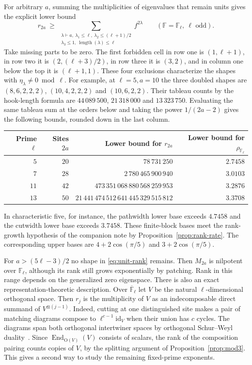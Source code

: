 \documentclass[11pt]{article}
\theoremstyle{definition}
\newcommand{\F}{\mathbb F}
\newcommand{\id}{\mathrm{id}}
\DeclareMathOperator{\End}{End}
\begin{document}
For arbitrary \(a\), summing the multiplicities of eigenvalues that remain units gives the explicit lower bound
\begin{equation}\label{eq:unit-rank}
 r_{2a}\ \ge\
 \sum_{\substack{\lambda\vdash a,\ \lambda_1\le\ell,\ \lambda_2\le(\ell+1)/2\\
                  \lambda_3\le1,\ \operatorname{length}(\lambda)\le\ell}} f^{2\lambda}
 \qquad(\F=\mathbb F_\ell,\ \ell\text{ odd}).
\end{equation}
Take missing parts to be zero. The first forbidden cell in row one is \((1,\ell+1)\), in row two it is \((2,(\ell+3)/2)\), in row three it is \((3,2)\), and in column one below the top it is \((\ell+1,1)\). These four exclusions characterize the shapes with \(\eta_\lambda\ne0\bmod\ell\). For example, at \(\ell=5,a=10\) the three doubled shapes are \((8,6,2,2,2)\), \((10,4,2,2,2)\) and \((10,6,2,2)\). Their tableau counts by the hook-length formula are \(44\,089\,500\), \(21\,318\,000\) and \(13\,323\,750\). Evaluating the same tableau sum at the orders below and taking the power \(1/(2a-2)\) gives the following bounds, rounded down in the last column.
\begin{center}
\begin{tabular}{@{}rrrr@{}}
\hline
Prime \(\ell\) & Sites \(2a\) & Lower bound for \(r_{2a}\) & Lower bound for \(\rho_{\mathbb F_\ell}\)\\
\hline
\(5\) & \(20\) & \(78\,731\,250\) & \(2.7458\)\\
\(7\) & \(28\) & \(2\,780\,465\,900\,940\) & \(3.0103\)\\
\(11\) & \(42\) & \(473\,351\,068\,880\,568\,259\,953\) & \(3.2876\)\\
\(13\) & \(50\) & \(21\,441\,474\,512\,641\,445\,329\,515\,812\) & \(3.3708\)\\
\hline
\end{tabular}
\end{center}
In characteristic five, for instance, the pathwidth lower base exceeds \(4.7458\) and the cutwidth lower base exceeds \(3.7458\). These finite-block bases meet the rank-growth hypothesis of the companion note by Proposition~\ref{prop:rank-rate}. The corresponding upper bases are \(4+2\cos(\pi/5)\) and \(3+2\cos(\pi/5)\).

For \(a>(5\ell-3)/2\) no shape in \eqref{eq:unit-rank} remains. Then \(M_{2a}\) is nilpotent over \(\mathbb F_\ell\), although its rank still grows exponentially by patching. Rank in this range depends on the generalized zero eigenspace. There is also an exact representation-theoretic description. Over \(\overline{\mathbb F}_\ell\) let \(V\) be the natural \(\ell\)-dimensional orthogonal space. Then \(r_j\) is the multiplicity of \(V\) as an indecomposable direct summand of \(V^{\otimes(j-1)}\). Indeed, cutting at one distinguished site makes a pair of matching diagrams compose to \(\ell^{c-1}\id_V\) when their union has \(c\) cycles. The diagrams span both orthogonal intertwiner spaces by orthogonal Schur--Weyl duality~\cite[Theorem~1.2]{doty-hu}. Since \(\End_{\mathrm O(V)}(V)\) consists of scalars, the rank of the composition pairing counts copies of \(V\), by the splitting argument of Proposition~\ref{prop:mod3}. This gives a second way to study the remaining fixed-prime exponents.
\end{document}
